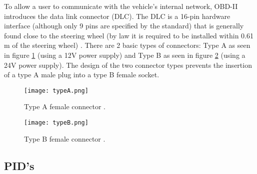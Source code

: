To allow a user to communicate with the vehicle's internal network, OBD-II introduces the data link connector (DLC). The DLC is a 16-pin hardware interface (although only 9 pins are specified by the standard) that is generally found close to the steering wheel (by law it is required to be installed within 0.61 m of the steering wheel) \cite{wiki:OBD}. There are 2 basic types of connectors: Type A as seen in figure \ref{fig:typeA} (using a 12V power supply) and Type B as seen in figure \ref{fig:typeB} (using a 24V power supply). The design of the two connector types prevents the insertion of a type A male plug into a type B female socket.

\begin{figure}[h]
	\label{fig:typeA}
	\centering
	\texttt{[image: typeA.png]}
	\caption{Type A female connector \cite{wiki:OBD}.}
\end{figure}

\begin{figure}[h]
	\label{fig:typeB}
	\centering
	\texttt{[image: typeB.png]}
	\caption{Type B female connector \cite{wiki:OBD}.}
\end{figure}

\subsection{PID's}
\label{subsec:obd:pid}

